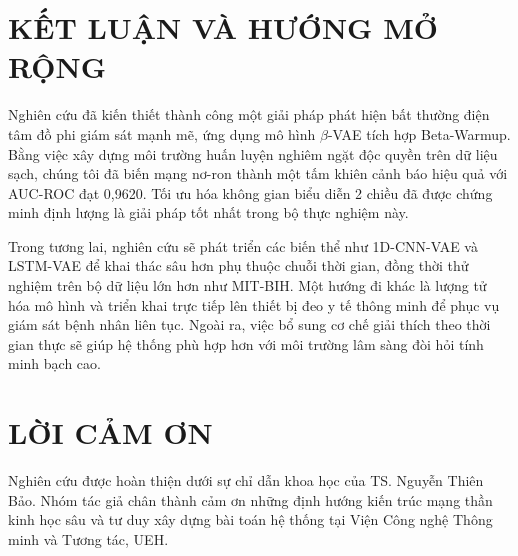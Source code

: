 \documentclass[conference]{IEEEtran}
\begin{document}
\section{KẾT LUẬN VÀ HƯỚNG MỞ RỘNG}
Nghiên cứu đã kiến thiết thành công một giải pháp phát hiện bất thường điện tâm đồ phi giám sát mạnh mẽ, ứng dụng mô hình \(\beta\)-VAE tích hợp Beta-Warmup. Bằng việc xây dựng môi trường huấn luyện nghiêm ngặt độc quyền trên dữ liệu sạch, chúng tôi đã biến mạng nơ-ron thành một tấm khiên cảnh báo hiệu quả với AUC-ROC đạt 0,9620. Tối ưu hóa không gian biểu diễn 2 chiều đã được chứng minh định lượng là giải pháp tốt nhất trong bộ thực nghiệm này.

Trong tương lai, nghiên cứu sẽ phát triển các biến thể như 1D-CNN-VAE và LSTM-VAE để khai thác sâu hơn phụ thuộc chuỗi thời gian, đồng thời thử nghiệm trên bộ dữ liệu lớn hơn như MIT-BIH. Một hướng đi khác là lượng tử hóa mô hình và triển khai trực tiếp lên thiết bị đeo y tế thông minh để phục vụ giám sát bệnh nhân liên tục. Ngoài ra, việc bổ sung cơ chế giải thích theo thời gian thực sẽ giúp hệ thống phù hợp hơn với môi trường lâm sàng đòi hỏi tính minh bạch cao.

\section*{LỜI CẢM ƠN}
Nghiên cứu được hoàn thiện dưới sự chỉ dẫn khoa học của TS. Nguyễn Thiên Bảo. Nhóm tác giả chân thành cảm ơn những định hướng kiến trúc mạng thần kinh học sâu và tư duy xây dựng bài toán hệ thống tại Viện Công nghệ Thông minh và Tương tác, UEH.
\end{document}
